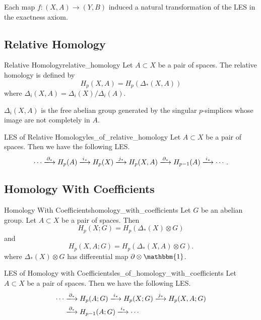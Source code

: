 \documentclass{article}
\begin{document}
Each map $f:(X,A) \rightarrow (Y,B)$ induced a natural transformation of the LES in the exactness axiom.

\subsection{Relative Homology}

\begin{definition}{Relative Homology}{relative_homology}
    Let $A\subset X$ be a pair of spaces.
    The relative homology is defined by
    \[ H_p(X,A) = H_p(\Delta_*(X,A)) \]
    where $\Delta_i(X,A) = \Delta_i(X)/\Delta_i(A)$.
\end{definition}
$\Delta_i(X,A)$ is the free abelian group generated by the singular $p$-simplices whose image are not completely in $A$.

\begin{theorem}{LES of Relative Homology}{les_of_relative_homology}
    Let $A\subset X$ be a pair of spaces.
    Then we have the following LES.
    \[ \cdots \xlongrightarrow{\partial_*} H_p(A) \xlongrightarrow{i_*} H_p(X) \xlongrightarrow{j_*} H_p(X,A) \xlongrightarrow{\partial_*} H_{p-1}(A) \xlongrightarrow{i_*} \cdots. \]
\end{theorem}

\subsection{Homology With Coefficients}

\begin{definition}{Homology With Coefficients}{homology_with_coefficients}
    Let $G$ be an abelian group.
    Let $A\subset X$ be a pair of spaces.
    Then
    \[ H_p(X;G) = H_p(\Delta_*(X) \otimes G) \]
    and
    \[ H_p(X,A;G) = H_p(\Delta_*(X,A) \otimes G). \]
    where $\Delta_*(X)\otimes G$ has differential map $\partial \otimes \mathbbm{1}$.
\end{definition}

\begin{theorem}{LES of Homology with Coefficients}{les_of_homology_with_coefficients}
    Let $A\subset X$ be a pair of spaces.
    Then we have the following LES.
    \begin{align*}
        \cdots &\xlongrightarrow{\partial_*} H_p(A;G) \xlongrightarrow{i_*} H_p(X;G) \xlongrightarrow{j_*} H_p(X,A;G) \\ &\xlongrightarrow{\partial_*} H_{p-1}(A;G) \xlongrightarrow{i_*} \cdots
    \end{align*}
\end{theorem}
\end{document}
